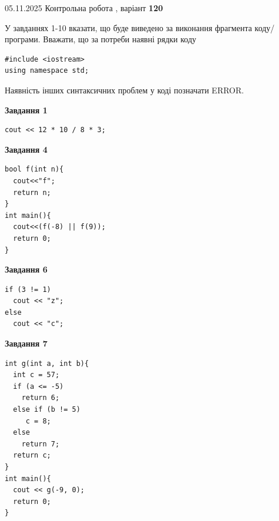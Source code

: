 \documentclass[12pt, ukrainian]{article}
\begin{document}
\newpage

{\Large{05.11.2025 Контрольна робота , варіант  \No \textbf { 120 }\par}}
{
\begin {large}
У завданнях 1-10 вказати, що буде виведено за виконання фрагмента коду/про\-гра\-ми.
Вважати, що за потреби наявні рядки коду
\begin{verbatim}
#include <iostream>
using namespace std;
\end{verbatim}
Наявність інших синтаксичних проблем у коді позначати ERROR.

\begin{minipage}[t]{7.0cm}

\begin{center}
\textbf{Завдання 1}
\end{center}
\vspace{-8mm}

\begin{verbatim}
cout << 12 * 10 / 8 * 3;
\end{verbatim}



\begin{center}
\textbf{Завдання 4}
\end{center}
\vspace{-8mm}

\begin{verbatim}
bool f(int n){
  cout<<"f";
  return n;
}
int main(){
  cout<<(f(-8) || f(9));
  return 0;
}
\end{verbatim}



\begin{center}
\textbf{Завдання 6}
\end{center}
\vspace{-8mm}

\begin{verbatim}
if (3 != 1)
  cout << "z";
else
  cout << "c";
\end{verbatim}



\begin{center}
\textbf{Завдання 7}
\end{center}
\vspace{-8mm}

\begin{verbatim}
int g(int a, int b){
  int c = 57;
  if (a <= -5)
    return 6;
  else if (b != 5)
     c = 8;
  else
    return 7;
  return c;
}
int main(){
  cout << g(-9, 0);
  return 0;
}
\end{verbatim}


\end{minipage}
\end{large}}
\end{document}
